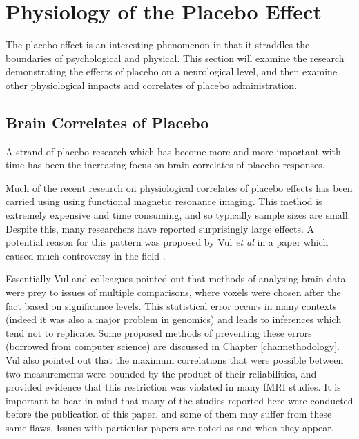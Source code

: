 \section{Physiology of the Placebo Effect}
\label{sec:neur-plac-effect}


The placebo effect is an interesting phenomenon in that it straddles the boundaries of psychological and physical. This section will examine the research demonstrating the effects of placebo on a neurological level, and then examine other physiological impacts and correlates of placebo administration. 




\subsection{Brain Correlates of Placebo}
\label{sec:brain-corr-plac}

A strand of placebo research which has become more and more important with time has been the increasing focus on brain correlates of placebo responses. 


Much of the recent research on physiological correlates of placebo effects has been carried using using functional magnetic resonance imaging. This method is extremely expensive and time consuming, and so typically sample sizes are small. Despite this, many researchers have reported surprisingly large effects. 
A potential reason for this pattern was proposed by Vul \textit{et al} in a paper which caused much controversy in the field \cite{vul2009puzzlingly} . 

Essentially Vul and colleagues pointed out that methods of analysing brain data were prey to issues of multiple comparisons, where voxels were chosen after the fact based on significance levels. This statistical error occurs in many contexts (indeed it was also a major problem in genomics) and leads to inferences which tend not to replicate. Some proposed methods of preventing these errors (borrowed from computer science) are discussed in Chapter \ref{cha:methodology}. Vul also pointed out that the maximum correlations that were possible between two measurements were bounded by the product of their reliabilities, and provided evidence that this restriction was violated in many fMRI studies. It is important to bear in mind that many of the studies reported here were conducted before the publication of this paper, and some of them may suffer from these same flaws. Issues with particular papers are noted as and when they appear. 

